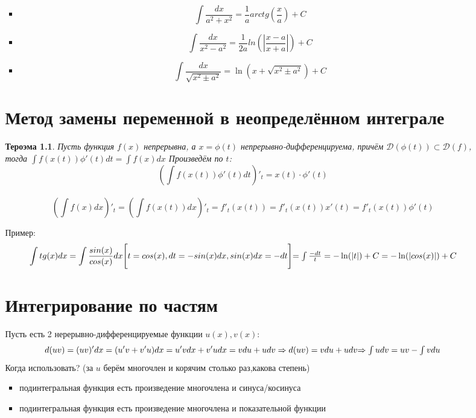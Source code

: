 \documentclass[oneside]{book}
\newtheorem{thm}{Тероэма}[chapter] %
\begin{document}
\begin{enumerate}
\begin{itemize}
\begin{enumerate}
\begin{itemize}
\begin{equation}
  \end{equation}
  \item \begin{equation}
    \int \frac{dx}{a^2 + x^2} = \frac{1}{a}arctg(\frac{x}{a}) + C
  \end{equation}
  \item \begin{equation}
    \int \frac{dx}{x^2 - a^2} = \frac{1}{2a}ln(|\frac{x - a}{x + a}|) + C
  \end{equation}
  \item \begin{equation}
    \int \frac{dx}{\sqrt{x^2 \pm a^2}} = \ln(x + \sqrt{x^2 \pm a^2}) + C
  \end{equation}
\end{itemize}

\chapter[Замен переменной]{Метод замены переменной в неопределённом интеграле\\}
\begin{thm}
  Пусть функция $f(x)$ непрерывна, а $x = \phi(t)$ непрерывно-дифференцируема, причём $\mathcal{D}(\phi(t)) \subset \mathcal{D}(f)$, тогда
  $\int f(x(t)) \phi'(t) dt = \int f(x) dx$ Произведём по $t$: $$
  (\int f(x(t)) \phi'(t) dt)'_t = x(t) \cdot \phi'(t) $$\\$$
  (\int f(x) dx)'_t = (\int f(x(t))dx)'_t = f'_t(x(t)) = f'_t(x(t))x'(t) = f'_t(x(t))\phi'(t)
  $$
\end{thm}
Пример:
\begin{equation}
  \int tg(x)dx = \int \frac{sin(x)}{cos(x)}dx \\
  \Bigg[t = cos(x), dt = -sin(x)dx, sin(x)dx = -dt \Bigg] $$\\$$ =
  \int \frac{-dt}{t} = -\ln(|t|)+C = -\ln(|cos(x)|) + C
\end{equation}

\chapter{Интегрирование по частям\\}
Пусть есть 2 нерерывно-дифференцируемые функции $u(x), v(x)$: \begin{equation}
  d(uv) = (uv)'dx = (u'v + v'u)dx = u'vdx + v'udx = vdu + udv \Rightarrow d(uv) = vdu + udv
  $\\$ \Rightarrow \int udv = uv - \int vdu
\end{equation}
Когда использовать?
(за $u$ берём многочлен и корячим столько раз,какова степень)
\begin{itemize}
  \item подинтегральная функция есть произведение многочлена и синуса/косинуса
  \item подинтегральная функция есть произведение многочлена и показательной функции
\end{itemize}





\end{enumerate}
\end{itemize}
\end{enumerate}
\end{document}

